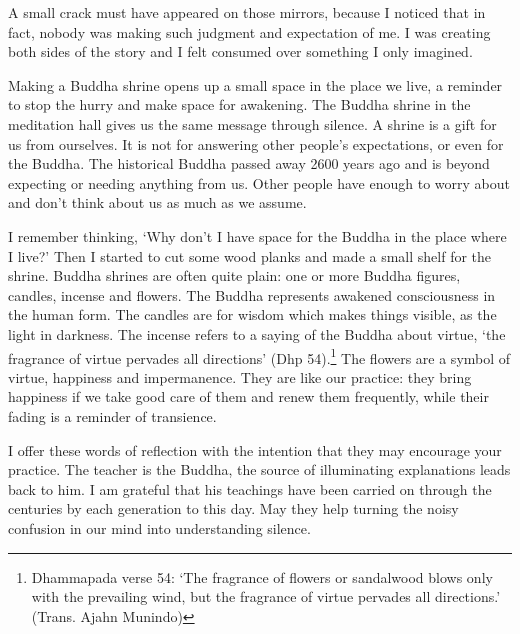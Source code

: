 A small crack must have appeared on those mirrors, because I noticed
that in fact, nobody was making such judgment and expectation of me. I
was creating both sides of the story and I felt consumed over something
I only imagined.

Making a Buddha shrine opens up a small space in the place we live, a
reminder to stop the hurry and make space for awakening. The Buddha
shrine in the meditation hall gives us the same message through silence.
A shrine is a gift for us from ourselves. It is not for answering other
people's expectations, or even for the Buddha. The historical Buddha
passed away 2600 years ago and is beyond expecting or needing anything
from us. Other people have enough to worry about and don't think about
us as much as we assume.

I remember thinking, `Why don't I have space for the Buddha in the place
where I live?' Then I started to cut some wood planks and made a small
shelf for the shrine. Buddha shrines are often quite plain: one or more
Buddha figures, candles, incense and flowers. The Buddha represents
awakened consciousness in the human form. The candles are for wisdom
which makes things visible, as the light in darkness. The incense refers
to a saying of the Buddha about virtue, `the fragrance of virtue
pervades all directions' (Dhp 54).\footnote{Dhammapada verse 54: `The
  fragrance of flowers or sandalwood blows only with the prevailing
  wind, but the fragrance of virtue pervades all directions.' (Trans.
  Ajahn Munindo)} The flowers are a symbol of virtue, happiness and
impermanence. They are like our practice: they bring happiness if we
take good care of them and renew them frequently, while their fading is
a reminder of transience.

I offer these words of reflection with the intention that they may
encourage your practice. The teacher is the Buddha, the source of
illuminating explanations leads back to him. I am grateful that his
teachings have been carried on through the centuries by each generation
to this day. May they help turning the noisy confusion in our mind into
understanding silence.
